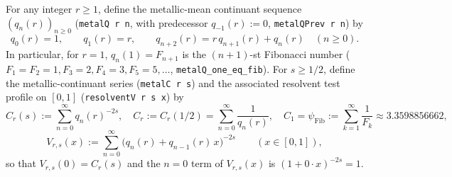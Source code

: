 \documentclass[11pt]{article}
\theoremstyle{definition}
\theoremstyle{remark}
\begin{document}
For any integer $r\ge1$, define the metallic-mean continuant sequence
$(q_n(r))_{n\ge0}$ (\texttt{metalQ r n}, with predecessor $q_{-1}(r):=0$,
\texttt{metalQPrev r n}) by
\begin{equation}\label{eq:metallic-continuant}
q_0(r)=1,\qquad q_1(r)=r,\qquad q_{n+2}(r)=r\,q_{n+1}(r)+q_n(r)\quad(n\ge0).
\end{equation}
In particular, for $r=1$, $q_n(1)=F_{n+1}$ is the $(n+1)$-st Fibonacci number
($F_1=F_2=1,F_3=2,F_4=3,F_5=5,\dots$, \texttt{metalQ\_\allowbreak one\_\allowbreak eq\_\allowbreak fib}).
For $s\ge1/2$, define the metallic-continuant series (\texttt{metalC r s}) and
the associated resolvent test profile on $[0,1]$ (\texttt{resolventV r s x}) by
\begin{equation}\label{eq:Cr-Dr}
C_r(s):=\sum_{n=0}^\infty q_n(r)^{-2s},\quad
C_r:=C_r(1/2)=\sum_{n=0}^\infty\frac{1}{q_n(r)},\quad
C_1=\psi_{\mathrm{Fib}}:=\sum_{k=1}^\infty\frac{1}{F_k}\approx 3.3598856662,
\end{equation}
\[
V_{r,s}(x):=\sum_{n=0}^\infty\bigl(q_n(r)+q_{n-1}(r)\,x\bigr)^{-2s}\qquad(x\in[0,1]),
\]
so that $V_{r,s}(0)=C_r(s)$ and the $n=0$ term of $V_{r,s}(x)$ is $(1+0\cdot x)^{-2s}=1$.
\end{document}
